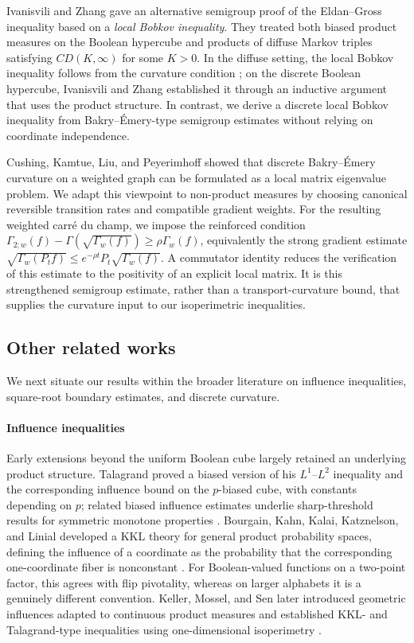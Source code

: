 Ivanisvili and Zhang \cite{IvanisviliZhang26} gave an alternative semigroup proof of the Eldan--Gross inequality based on a \emph{local Bobkov inequality}. They treated both biased product measures on the Boolean hypercube and products of diffuse Markov triples satisfying $CD(K,\infty)$ for some $K>0$. In the diffuse setting, the local Bobkov inequality follows from the curvature condition \cite{BGL-book}; on the discrete Boolean hypercube, Ivanisvili and Zhang established it through an inductive argument that uses the product structure. In contrast, we derive a discrete local Bobkov inequality from Bakry--\'Emery-type semigroup estimates without relying on coordinate independence.

Cushing, Kamtue, Liu, and Peyerimhoff \cite{CKLP22} showed that discrete Bakry--\'Emery curvature on a weighted graph can be formulated as a local matrix eigenvalue problem. We adapt this viewpoint to non-product measures by choosing canonical reversible transition rates and compatible gradient weights. For the resulting weighted carr\'e du champ, we impose the reinforced condition $\Gamma_{2;w}(f)-\Gamma(\sqrt{\Gamma_w(f)}) \geq \rho\Gamma_w(f)$, equivalently the strong gradient estimate $\sqrt{\Gamma_w(P_t f)} \leq e^{-\rho t}P_t\sqrt{\Gamma_w(f)}$. A commutator identity reduces the verification of this estimate to the positivity of an explicit local matrix. It is this strengthened semigroup estimate, rather than a transport-curvature bound, that supplies the curvature input to our isoperimetric inequalities.


\subsection{Other related works}
We next situate our results within the broader literature on influence inequalities, square-root boundary estimates, and discrete curvature.

\paragraph{Influence inequalities}
Early extensions beyond the uniform Boolean cube largely retained an underlying product structure. Talagrand proved a biased version of his $L^1$--$L^2$ inequality and the corresponding influence bound on the $p$-biased cube, with constants depending on $p$; related biased influence estimates underlie sharp-threshold results for symmetric monotone properties \cite{Talagrand94,FriedgutKalai96}. Bourgain, Kahn, Kalai, Katznelson, and Linial developed a KKL theory for general product probability spaces, defining the influence of a coordinate as the probability that the corresponding one-coordinate fiber is nonconstant \cite{BKKKL92}. For Boolean-valued functions on a two-point factor, this agrees with flip pivotality, whereas on larger alphabets it is a genuinely different convention. Keller, Mossel, and Sen later introduced geometric influences adapted to continuous product measures and established KKL- and Talagrand-type inequalities using one-dimensional isoperimetry \cite{KellerMosselSen12}.


